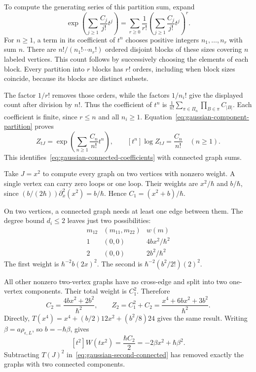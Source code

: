 To compute the generating series of this partition sum, expand
\[
 \exp\left(\sum_{j\geq1}\frac{C_j}{j!}t^j\right)
 =\sum_{r\geq0}\frac1{r!}
       \left(\sum_{j\geq1}\frac{C_j}{j!}t^j\right)^r.
\]
For $n\geq1$, a term in its coefficient of $t^n$ chooses positive
integers $n_1,\ldots,n_r$ with sum $n$.
There are $n!/(n_1!\cdots n_r!)$ ordered disjoint blocks of these sizes
covering $n$ labeled vertices.
This count follows by successively choosing the elements of each block.
Every partition into $r$ blocks has $r!$ orders, including when block
sizes coincide, because its blocks are distinct subsets.

The factor $1/r!$ removes those orders, while the factors $1/n_i!$
give the displayed count after division by $n!$.
Thus the coefficient of $t^n$ is
$\frac1{n!}\sum_{\pi\in\Pi_n}\prod_{B\in\pi}C_{|B|}$.
Each coefficient is finite, since $r\leq n$ and all $n_i\geq1$.
Equation~\eqref{eq:gaussian-component-partition} proves
\[
 Z_{tJ}=\exp\left(\sum_{n\geq1}\frac{C_n}{n!}t^n\right),
 \qquad [t^n]\log Z_{tJ}=\frac{C_n}{n!}\quad(n\geq1).
\]
This identifies~\eqref{eq:gaussian-connected-coefficients} with connected
graph sums.

Take $J=x^2$ to compute every graph on two vertices with nonzero weight.
A single vertex can carry zero loops or one loop.
Their weights are $x^2/\hbar$ and $b/\hbar$, since
$(b/(2\hbar))\partial_x^2(x^2)=b/\hbar$.
Hence $C_1=(x^2+b)/\hbar$.

On two vertices, a connected graph needs at least one edge between them.
The degree bound $d_i\leq2$ leaves just two possibilities:
\[
 \begin{array}{c|c|c}
 m_{12}&(m_{11},m_{22})&w(m)\\ \hline
 1&(0,0)&4b x^2/\hbar^2\\
 2&(0,0)&2b^2/\hbar^2
 \end{array}
\]
The first weight is $\hbar^{-2}b(2x)^2$.
The second is $\hbar^{-2}(b^2/2!)(2)^2$.

All other nonzero two-vertex graphs have no cross-edge and split into
two one-vertex components. Their total weight is $C_1^2$.
Therefore
\[
 C_2=\frac{4b x^2+2b^2}{\hbar^2},\qquad
 Z_2=C_1^2+C_2=\frac{x^4+6b x^2+3b^2}{\hbar^2}.
\]
Directly, $T(x^4)=x^4+(b/2)12x^2+(b^2/8)24$ gives the same result.
Writing $\beta=a\rho_{\epsilon,L}$, so $b=-\hbar\beta$, gives
\[
 [t^2]W(tx^2)=\frac{\hbar C_2}{2}
             =-2\beta x^2+\hbar\beta^2.
\]
Subtracting $T(J)^2$ in~\eqref{eq:gaussian-second-connected} has removed
exactly the graphs with two connected components.

